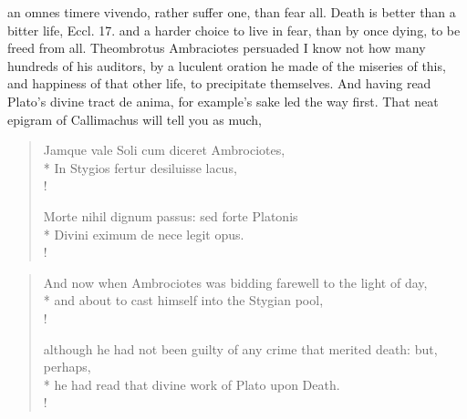 an omnes timere vivendo,  rather suffer one, than fear all. Death
is better than a bitter life, Eccl.  17. and a harder choice
to live in fear, than by once dying, to be freed from all. Theombrotus
Ambraciotes persuaded I know not how many hundreds of his auditors, by
a luculent oration he made of the miseries of this, and happiness of
that other life, to precipitate themselves. And having read Plato's
divine tract de anima, for example's sake led the way first. That neat
epigram of Callimachus will tell you as much,
%
\begin{latin}%
\begin{verse}%
Jamque vale Soli cum diceret Ambrociotes,\\*
In Stygios fertur desiluisse lacus,\\!

Morte nihil dignum passus: sed forte Platonis\\*
Divini eximum de nece legit opus.\\!
\end{verse}%
\end{latin}%
\translationrule%
\begin{verse}%
And now when Ambrociotes was bidding farewell to the light of day,\\*
and about to cast himself into the Stygian pool,\\!

although he had not been guilty of any crime that merited death: but, perhaps,\\*
he had read that divine work of Plato upon Death.\\!
\end{verse}%
%

